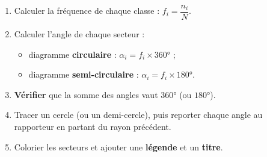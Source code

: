 \documentclass[11pt]{article}
\newcommand{\cle}[1]{{\popxbold\color{popdark}#1}}
\begin{document}
\begin{methode}
\begin{enumerate}
\item Calculer la \cle{fréquence} de chaque classe : $f_i = \dfrac{n_i}{N}$.
\item Calculer l'\cle{angle} de chaque secteur :
\begin{itemize}
\item diagramme \textbf{circulaire} : $\alpha_i = f_i \times 360°$ ;
\item diagramme \textbf{semi-circulaire} : $\alpha_i = f_i \times 180°$.
\end{itemize}
\item \textbf{Vérifier} que la somme des angles vaut $360°$ (ou $180°$).
\item Tracer un cercle (ou un demi-cercle), puis reporter chaque angle au rapporteur en partant du rayon précédent.
\item Colorier les secteurs et ajouter une \textbf{légende} et un \textbf{titre}.
\end{enumerate}
\end{methode}
\end{document}
